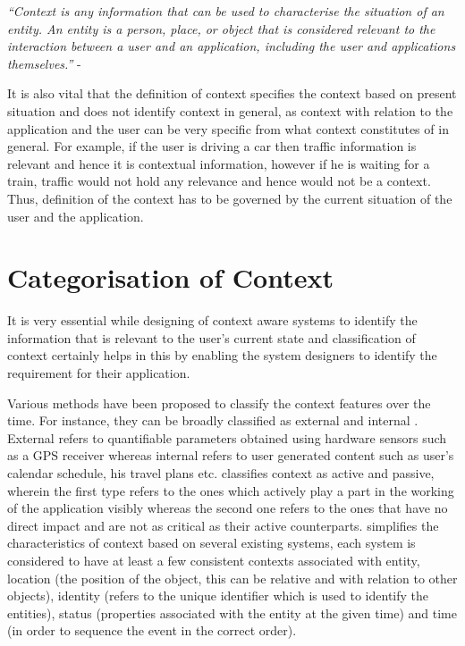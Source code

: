 \documentclass[12pt]{report}
\begin{document}
\textit{``Context is any information that can be used to characterise the situation of an entity. An entity is a person, place, or object that is considered relevant to the interaction between a user and an application, including the user and applications themselves.''} - \cite{dey2001understanding}


It is also vital that the definition of context specifies the context based on present situation and does not identify context in general, as context with relation to the application and the user can be very specific from what context constitutes of in general. For example, if the user is driving a car then traffic information is relevant and hence it is contextual information, however if he is waiting for a train, traffic would not hold any relevance and hence would not be a context. Thus, definition of the context has to be governed by the current situation of the user and the application.

\section{Categorisation of Context}

It is very essential while designing of context aware systems to identify the information that is relevant to the user's current state and classification of context certainly helps in this by enabling the system designers to identify the requirement for their application.

Various methods have been proposed to classify the context features over the time. For instance, they can be broadly classified as external and internal \cite{gustavsen2002condor}. External refers to quantifiable parameters obtained using hardware sensors such as a GPS receiver whereas internal refers to user generated content such as user's calendar schedule, his travel plans etc. \cite{chen2000survey} classifies context as active and passive, wherein the first type refers to the ones which actively play a part in the working of the application visibly whereas the second one refers to the ones that have no direct impact and are not as critical as their active counterparts. \cite{abowd1999towards} simplifies the characteristics of context based on several existing systems, each system is considered to have at least a few consistent contexts associated with entity, location (the position of the object, this can be relative and with relation to other objects), identity (refers to the unique identifier which is used to identify the entities), status (properties associated with the entity at the given time) and time (in order to sequence the event in the correct order).
\end{document}
